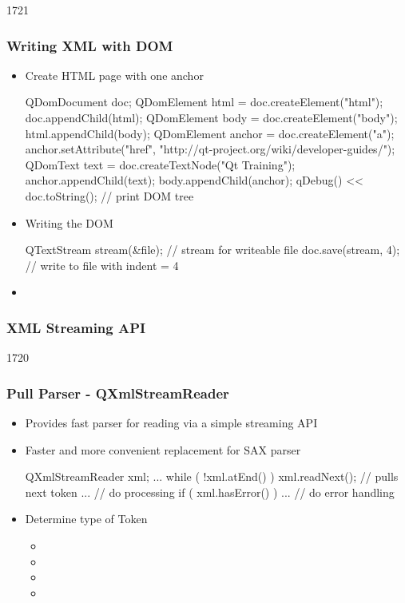 \begin{slide}[fragile]{1721}\frametitle{Writing XML with DOM}
\begin{itemize}
\item Create HTML page with one anchor
  \begin{cpp}
QDomDocument doc;
QDomElement html = doc.createElement("html");
doc.appendChild(html);
QDomElement body = doc.createElement("body");
html.appendChild(body);
QDomElement anchor = doc.createElement("a");
anchor.setAttribute("href", "http://qt-project.org/wiki/developer-guides/");
QDomText text = doc.createTextNode("Qt Training");
anchor.appendChild(text);
body.appendChild(anchor);
qDebug() << doc.toString(); // print DOM tree
  \end{cpp}
\item Writing the DOM
  \begin{cpp}
QTextStream stream(&file); // stream for writeable file
doc.save(stream, 4); // write to file with indent = 4    
  \end{cpp}
 \item {}
  \end{itemize}
\end{slide}

\subsubsection{XML Streaming API}
\begin{slide}[fragile]{1720}\frametitle{Pull Parser - QXmlStreamReader} \label{QXmlStreamReader}
\begin{itemize}
\item Provides fast parser for reading via a simple streaming API
\item Faster and more convenient replacement for SAX parser
  \begin{cpp}
QXmlStreamReader xml;
...
while ( !xml.atEnd() ) {
  xml.readNext(); // pulls next token
  ... // do processing
}
if ( xml.hasError() ) {
  ... // do error handling
}    
  \end{cpp}
\item Determine type of Token
  \begin{itemize}
  \item {}
  \item {}
  \item {}
  \item {}
 \end{itemize}
\end{itemize}
\end{slide}

